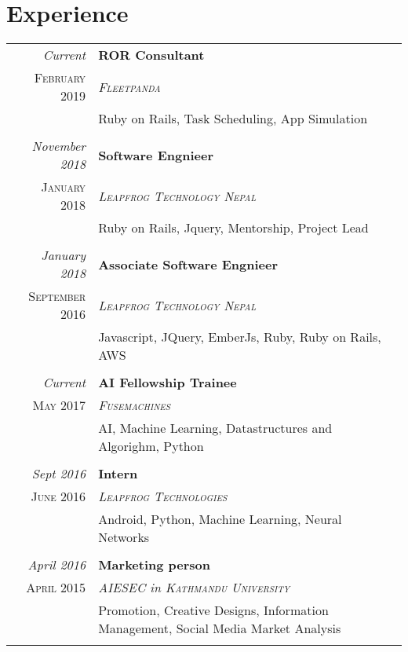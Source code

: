 \documentclass[a4paper,10pt]{article}
\begin{document}
\section{Experience}
\begin{tabular}{r|p{11cm}}
\emph{Current	} & \textbf{ROR Consultant}\\ \textsc{February 2019} & \emph{\textsc{Fleetpanda}} \\&\footnotesize{Ruby on Rails, Task Scheduling, App Simulation}\\\multicolumn{2}{c}{} \\
\emph{November 2018	} & \textbf{Software Engnieer}\\ \textsc{January 2018} & \emph{\textsc{Leapfrog Technology Nepal}} \\&\footnotesize{Ruby on Rails, Jquery, Mentorship, Project Lead}\\\multicolumn{2}{c}{} \\
\emph{January 2018} & \textbf{Associate Software Engnieer}\\ \textsc{September 2016} & \emph{\textsc{Leapfrog Technology Nepal}} \\&\footnotesize{Javascript, JQuery, EmberJs, Ruby, Ruby on Rails, AWS}\\\multicolumn{2}{c}{} \\
 \emph{Current} & \textbf{AI Fellowship Trainee}\\ \textsc{May 2017} & \emph{\textsc{Fusemachines}} \\&\footnotesize{AI, Machine Learning, Datastructures and Algorighm, Python}\\\multicolumn{2}{c}{} \\
 \emph{Sept 2016} & \textbf{Intern}\\ \textsc{June 2016} & \emph{\textsc{Leapfrog Technologies}} \\&\footnotesize{Android, Python, Machine Learning, Neural Networks}\\\multicolumn{2}{c}{} \\
 \emph{April 2016} & \textbf{Marketing person}\\ \textsc{April 2015} & \emph{\textsc{AIESEC} in \textsc{Kathmandu University}} \\&\footnotesize{Promotion, Creative Designs, Information Management, Social Media Market Analysis}\\\multicolumn{2}{c}{} \\
\end{tabular}
\end{document}
